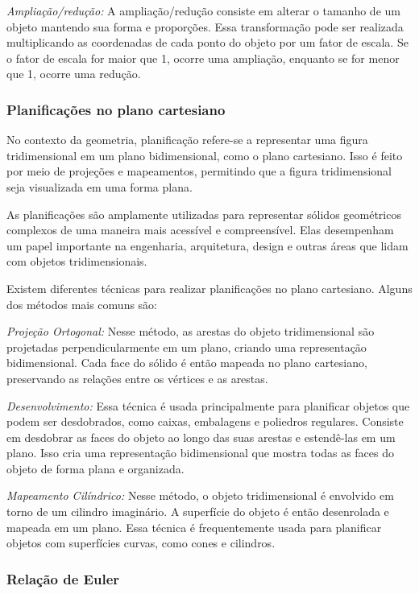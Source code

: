 {\medskip \noindent  \textit{Ampliação/redução:} A ampliação/redução consiste em alterar o tamanho de
um objeto mantendo sua forma e proporções. Essa transformação pode ser
realizada multiplicando as coordenadas de cada ponto do objeto por um
fator de escala. Se o fator de escala for maior que 1, ocorre uma
ampliação, enquanto se for menor que 1, ocorre uma redução.

\subsubsection{Planificações no plano cartesiano}

No contexto da geometria, planificação refere-se a representar uma
figura tridimensional em um plano bidimensional, como o plano
cartesiano. Isso é feito por meio de projeções e mapeamentos, permitindo
que a figura tridimensional seja visualizada em uma forma plana.

As planificações são amplamente utilizadas para representar sólidos
geométricos complexos de uma maneira mais acessível e compreensível.
Elas desempenham um papel importante na engenharia, arquitetura, design
e outras áreas que lidam com objetos tridimensionais.

Existem diferentes técnicas para realizar planificações no plano
cartesiano. Alguns dos métodos mais comuns são:

\medskip \noindent  \textit{Projeção Ortogonal:} Nesse método, as arestas do objeto tridimensional
são projetadas perpendicularmente em um plano, criando uma representação
bidimensional. Cada face do sólido é então mapeada no plano cartesiano,
preservando as relações entre os vértices e as arestas.

 \medskip \noindent  \textit{Desenvolvimento:} Essa técnica é usada principalmente para planificar
objetos que podem ser desdobrados, como caixas, embalagens e poliedros
regulares. Consiste em desdobrar as faces do objeto ao longo das suas
arestas e estendê-las em um plano. Isso cria uma representação
bidimensional que mostra todas as faces do objeto de forma plana e
organizada.

\medskip \noindent  \textit{Mapeamento Cilíndrico:} Nesse método, o objeto tridimensional é envolvido
em torno de um cilindro imaginário. A superfície do objeto é então
desenrolada e mapeada em um plano. Essa técnica é frequentemente usada
para planificar objetos com superfícies curvas, como cones e cilindros.

\subsubsection{Relação de Euler}

}
